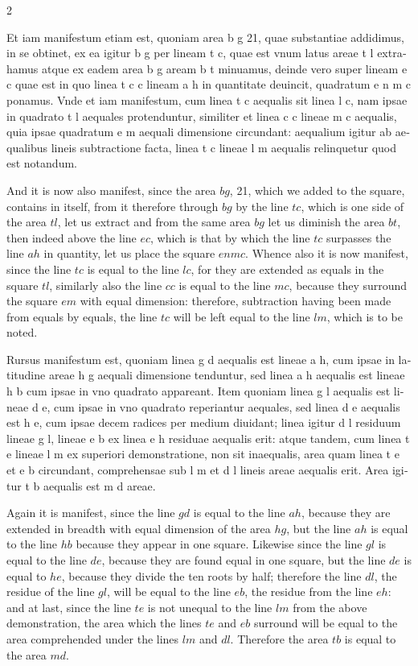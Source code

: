 \documentclass[11pt,a4paper,twoside]{book}
\newcommand{\latincolumn}[1]{\textlatin{\small #1}}
\begin{document}
\begin{paracol}{2}
\switchcolumn*

\latincolumn{Et iam manifestum etiam est, quoniam area b g 21, quae substantiae addidimus, in se obtinet, ex ea igitur b g per lineam t c, quae est vnum latus areae t l extrahamus atque ex eadem area b g aream b t minuamus, deinde vero super lineam e c quae est in quo linea t c c lineam a h in quantitate deuincit, quadratum e n m c ponamus. Vnde et iam manifestum, cum linea t c aequalis sit linea l c, nam ipsae in quadrato t l aequales protenduntur, similiter et linea c c lineae m c aequalis, quia ipsae quadratum e m aequali dimensione circundant: aequalium igitur ab aequalibus lineis subtractione facta, linea t c lineae l m aequalis relinquetur quod est notandum.}

\switchcolumn

And it is now also manifest, since the area $bg$, 21, which we added to the square, contains in itself, from it therefore through $bg$ by the line $tc$, which is one side of the area $tl$, let us extract and from the same area $bg$ let us diminish the area $bt$, then indeed above the line $ec$, which is that by which the line $tc$ surpasses the line $ah$ in quantity, let us place the square $enmc$. Whence also it is now manifest, since the line $tc$ is equal to the line $lc$, for they are extended as equals in the square $tl$, similarly also the line $cc$ is equal to the line $mc$, because they surround the square $em$ with equal dimension: therefore, subtraction having been made from equals by equals, the line $tc$ will be left equal to the line $lm$, which is to be noted.

\switchcolumn*

\latincolumn{Rursus manifestum est, quoniam linea g d aequalis est lineae a h, cum ipsae in latitudine areae h g aequali dimensione tenduntur, sed linea a h aequalis est lineae h b cum ipsae in vno quadrato appareant. Item quoniam linea g l aequalis est lineae d e, cum ipsae in vno quadrato reperiantur aequales, sed linea d e aequalis est h e, cum ipsae decem radices per medium diuidant; linea igitur d l residuum lineae g l, lineae e b ex linea e h residuae aequalis erit: atque tandem, cum linea t e lineae l m ex superiori demonstratione, non sit inaequalis, area quam linea t e et e b circundant, comprehensae sub l m et d l lineis areae aequalis erit. Area igitur t b aequalis est m d areae.}

\switchcolumn

Again it is manifest, since the line $gd$ is equal to the line $ah$, because they are extended in breadth with equal dimension of the area $hg$, but the line $ah$ is equal to the line $hb$ because they appear in one square. Likewise since the line $gl$ is equal to the line $de$, because they are found equal in one square, but the line $de$ is equal to $he$, because they divide the ten roots by half; therefore the line $dl$, the residue of the line $gl$, will be equal to the line $eb$, the residue from the line $eh$: and at last, since the line $te$ is not unequal to the line $lm$ from the above demonstration, the area which the lines $te$ and $eb$ surround will be equal to the area comprehended under the lines $lm$ and $dl$. Therefore the area $tb$ is equal to the area $md$.


\end{paracol}
\end{document}

